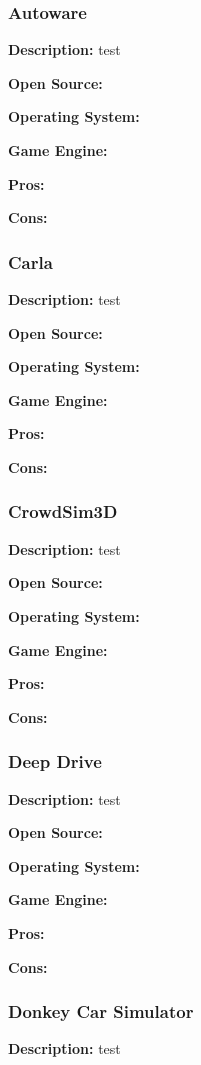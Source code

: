\subsubsection{Autoware}
\textbf{Description:} test

\textbf{Open Source:}

\textbf{Operating System:}

\textbf{Game Engine:}

\textbf{Pros:}

\textbf{Cons:}


\subsubsection{Carla}
\textbf{Description:} test

\textbf{Open Source:}

\textbf{Operating System:}

\textbf{Game Engine:}

\textbf{Pros:}

\textbf{Cons:}


\subsubsection{CrowdSim3D}
\textbf{Description:} test

\textbf{Open Source:}

\textbf{Operating System:}

\textbf{Game Engine:}

\textbf{Pros:}

\textbf{Cons:}

\subsubsection{Deep Drive}
\textbf{Description:} test

\textbf{Open Source:}

\textbf{Operating System:}

\textbf{Game Engine:}

\textbf{Pros:}

\textbf{Cons:}


\subsubsection{Donkey Car Simulator}
\textbf{Description:} test

